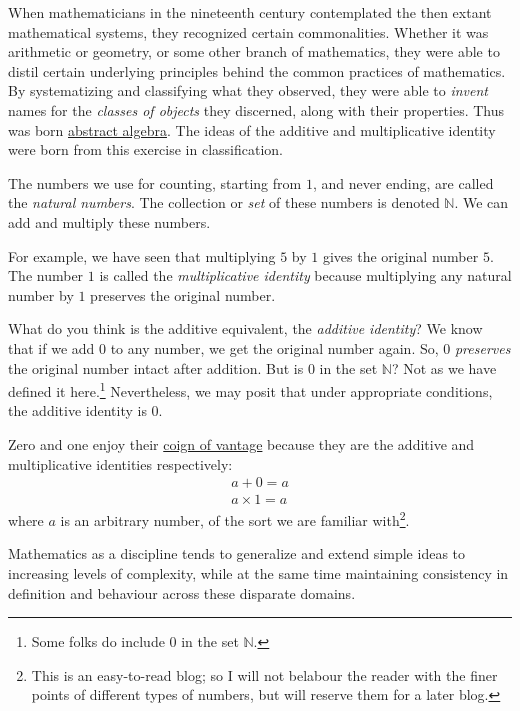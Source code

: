 \documentclass[
  a4paper,
]{article}
\begin{document}
When mathematicians in the nineteenth century contemplated the then
extant mathematical systems, they recognized certain commonalities.
Whether it was arithmetic or geometry, or some other branch of
mathematics, they were able to distil certain underlying principles
behind the common practices of mathematics. By systematizing and
classifying what they observed, they were able to \emph{invent} names
for the \emph{classes of objects} they discerned, along with their
properties. Thus was born
\href{https://en.wikipedia.org/wiki/Abstract_algebra}{abstract algebra}.
The ideas of the additive and multiplicative identity were born from
this exercise in classification.

The numbers we use for counting, starting from \(1\), and never ending,
are called the \emph{natural numbers}. The collection or \emph{set} of
these numbers is denoted \(\mathbb{N}\). We can add and multiply these
numbers.

For example, we have seen that multiplying \(5\) by \(1\) gives the
original number \(5\). The number \(1\) is called the
\emph{multiplicative identity} because multiplying any natural number by
\(1\) preserves the original number.

What do you think is the additive equivalent, the \emph{additive
identity}? We know that if we add \(0\) to any number, we get the
original number again. So, \(0\) \emph{preserves} the original number
intact after addition. But is \(0\) in the set \(\mathbb{N}\)? Not as we
have defined it here.\footnote{Some folks do include \(0\) in the set
  \(\mathbb{N}\).} Nevertheless, we may posit that under appropriate
conditions, the additive identity is \(0\).

Zero and one enjoy their
\href{https://dictionary.cambridge.org/dictionary/english/coign-of-vantage}{coign
of vantage} because they are the additive and multiplicative identities
respectively: \[
\begin{aligned}
a + 0 = a\\
a \times 1 = a
\end{aligned}
\] where \(a\) is an arbitrary number, of the sort we are familiar
with\footnote{This is an easy-to-read blog; so I will not belabour the
  reader with the finer points of different types of numbers, but will
  reserve them for a later blog.}.

Mathematics as a discipline tends to generalize and extend simple ideas
to increasing levels of complexity, while at the same time maintaining
consistency in definition and behaviour across these disparate domains.
\end{document}
